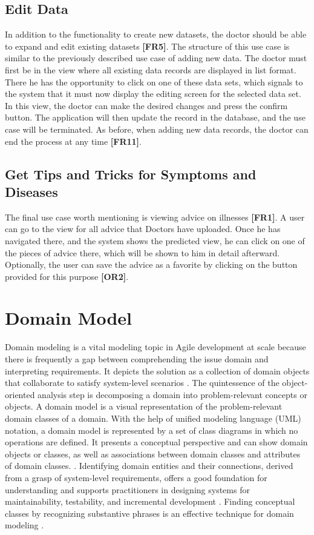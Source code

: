 \subsection{Edit Data}
In addition to the functionality to create new datasets, the doctor should be able to expand and edit existing datasets \textbf{[FR5]}. The structure of this use case is similar to the previously described use case of adding new data. The doctor must first be in the view where all existing data records are displayed in list format. There he has the opportunity to click on one of these data sets, which signals to the system that it must now display the editing screen for the selected data set. In this view, the doctor can make the desired changes and press the confirm button. The application will then update the record in the database, and the use case will be terminated. As before, when adding new data records, the doctor can end the process at any time \textbf{[FR11]}.

\subsection{Get Tips and Tricks for Symptoms and Diseases}
The final use case worth mentioning is viewing advice on illnesses \textbf{[FR1]}. A user can go to the view for all advice that Doctors have uploaded. Once he has navigated there, and the system shows the predicted view, he can click on one of the pieces of advice there, which will be shown to him in detail afterward. Optionally, the user can save the advice as a favorite by clicking on the button provided for this purpose \textbf{[OR2]}. 

\section{Domain Model}
Domain modeling is a vital modeling topic in Agile development at scale because there is frequently a gap between comprehending the issue domain and interpreting requirements. It depicts the solution as a collection of domain objects that collaborate to satisfy system-level scenarios \cite{.safe}. The quintessence of the object-oriented analysis step is decomposing a domain into problem-relevant concepts or objects. A domain model is a visual representation of the problem-relevant domain classes of a domain. With the help of unified modeling language (UML) notation, a domain model is represented by a set of class diagrams in which no operations are defined. It presents a conceptual perspective and can show domain objects or classes, as well as associations between domain classes and attributes of domain classes.\cite{.safe} \cite{.domainmodel}. Identifying domain entities and their connections, derived from a grasp of system-level requirements, offers a good foundation for understanding and supports practitioners in designing systems for maintainability, testability, and incremental development \cite{.safe}. Finding conceptual classes by recognizing substantive phrases is an effective technique for domain modeling \cite[p. 76]{.domainmodel}.

